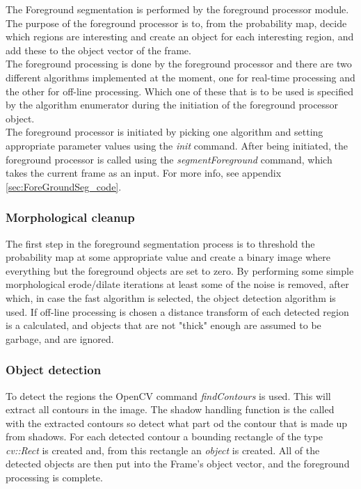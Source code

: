 The Foreground segmentation is performed by the foreground processor module. The purpose of the foreground processor is to, 
from the probability map, decide which regions are interesting and create an object for each interesting region, and add 
these to the object vector of the frame. \\
\newline
The foreground processing is done by the foreground processor and there are two different algorithms implemented at the 
moment, one for real-time processing and the other for off-line processing. Which one of these that is to be used is 
specified by the algorithm enumerator during the initiation of the foreground processor object. \\
\newline
The foreground processor is initiated by picking one algorithm and setting appropriate parameter values using the 
\emph{init} command. After being initiated, the foreground processor is called using the \emph{segmentForeground} 
command, which takes the current frame as an input. For more info, see appendix \ref{sec:ForeGroundSeg_code}.

\subsubsection{Morphological cleanup}
The first step in the foreground segmentation process is to threshold the probability map at some appropriate value 
and create a binary image where everything but the foreground objects are set to zero. By performing some simple 
morphological erode/dilate iterations at least some of the noise is removed, after which, in case the fast algorithm 
is selected, the object detection algorithm is used. If off-line processing is chosen a distance transform of each 
detected region is a calculated, and objects that are not "thick" enough are assumed to be garbage, and are ignored.


\subsubsection{Object detection}
To detect the regions the OpenCV command \emph{findContours} is used. This will extract all contours in the image. The shadow handling function is the called with the extracted contours so detect what part od the contour that is made up from shadows. For each detected contour a bounding rectangle of the type \emph{cv::Rect} is created and, from this rectangle an 
\emph{object} is created. All of the detected objects are then put into the Frame's object vector, 
and the foreground processing is complete.
